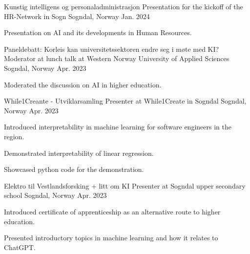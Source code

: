 
\begin{cventries}

\cventry
  {Kunstig intelligens og personaladministrasjon} %
  {Presentation for the kickoff of the HR-Network in Sogn} %
  {Sogndal, Norway} %
  {Jan. 2024} %
  {
    \begin{cvitems} %
      \item {Presentation on AI and its developments in Human Resources.}
    \end{cvitems}
  }

\cventry
  {Paneldebatt: Korleis kan universitetssektoren endre seg i møte med KI?} %
  {Moderator at lunch talk at Western Norway University of Applied Sciences} %
  {Sogndal, Norway} %
  {Apr. 2023} %
  {
    \begin{cvitems} %
      \item {Moderated the discussion on AI in higher education.}
    \end{cvitems}
  }


\cventry
  {While1Creante - Utviklarsamling} %
  {Presenter at While1Create in Sogndal} %
  {Sogndal, Norway} %
  {Apr. 2023} %
  {
    \begin{cvitems} %
      \item {Introduced interpretability in machine learning for software engineers in the region.}
      \item {Demonstrated interpretability of linear regression.}
      \item {Showcased python code for the demonstration.}
    \end{cvitems}
  }


\cventry
  {Elektro til Vestlandsforsking + litt om KI} %
  {Presenter at Sogndal upper secondary school} %
  {Sogndal, Norway} %
  {Apr. 2023} %
  {
    \begin{cvitems} %
      \item {Introduced certificate of apprenticeship as an alternative route to higher education.}
      \item {Presented introductory topics in machine learning and how it relates to ChatGPT.}
    \end{cvitems}
  }


\end{cventries}
